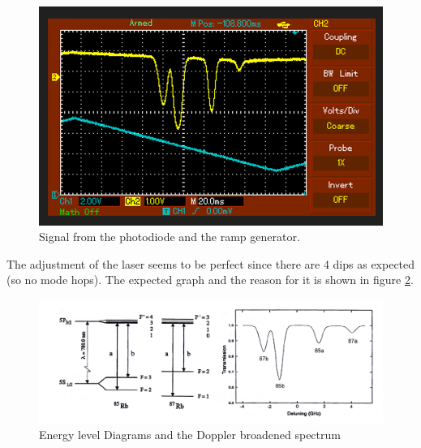\begin{figure}
    \centering
    \includegraphics[width=\textwidth]{BMP.png}
    \caption{Signal from the photodiode and the ramp generator.}
    \label{fig:ffl}
\end{figure}

\noindent
The adjustment of the laser seems to be perfect since there are 4 dips as expected (so no mode hops). The 
expected graph and the reason for it is shown in figure \ref{fig:lit}.

\begin{figure}
    \centering
    \includegraphics[width=\textwidth]{lit.png}
    \caption{Energy level Diagrams and the Doppler broadened spectrum \cite{V60}}
    \label{fig:lit}
\end{figure}

